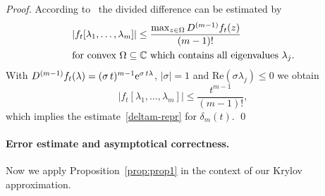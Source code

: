 \documentclass[smallextended]{svjour3pre}%
\numberwithin{equation}{section}
\numberwithin{figure}{section}
\numberwithin{table}{section}
\newcommand{\C}{\mathbb C}%
\newcommand{\divdif}[2]{#2[#1]}
\newcommand{\ee}{{\rm e}}
\newcommand\sca{\sigma}
\begin{document}
\begin{proof}

According to~\cite[(B.28)]{higham08} the divided
difference can be estimated by
\begin{align*}
&|f_t[\lambda_1,\ldots,\lambda_m]| \leq
 \frac{\max_{z \in \Omega} D^{(m-1)}f_t(z)}{(m-1)!}\\
&\text{for convex $\Omega \subseteq \C$
which contains all eigenvalues $ \lambda_j$.}
\end{align*}
With $D^{(m-1)}f_t(\lambda) =
(\sca\,t)^{m-1} \ee^{\sca\,t\lambda} $,
$ |\sca|=1 $ and $\text{Re}(\sca \lambda_j)\leq 0$ we obtain
\begin{equation*}
|\divdif{\lambda_1,\ldots,\lambda_m}{f_t}| \leq \frac{t^{m-1}}{(m-1)!},
\end{equation*}
which implies the estimate~\eqref{deltam-repr}
for $ \delta_m(t) $. \qed
\end{proof}

\paragraph{Error estimate and asymptotical correctness.}

Now we apply Proposition~\ref{prop:prop1} in the context of
our Krylov approximation.
\end{document}
